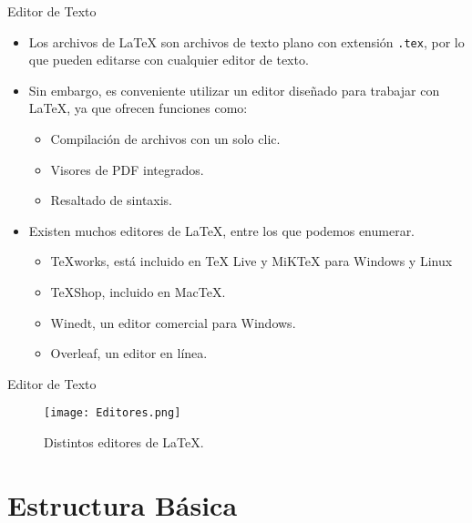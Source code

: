 \documentclass[12pt]{beamer}
\begin{document}
\begin{frame}{Editor de Texto}
  \begin{itemize}
    \item Los archivos de \LaTeX{} son archivos de texto plano con extensión {\color{blue}\texttt{.tex}}, por lo que pueden editarse con cualquier editor de texto.
    \item<2-> Sin embargo, es conveniente utilizar un editor diseñado para trabajar con LaTeX, ya que ofrecen funciones como:
    \begin{itemize}
      \item<3-> Compilación de archivos con un solo clic.
      \item<4-> Visores de PDF integrados.
      \item<5-> Resaltado de sintaxis.
    \end{itemize}
    \item<6-> Existen muchos editores de \LaTeX{}, entre los que podemos enumerar.
    \begin{itemize}
      \item<7-> TeXworks, está incluido en TeX Live y MiKTeX para Windows y Linux
      \item<8-> TeXShop, incluido en MacTeX.
      \item<9-> Winedt, un editor comercial para Windows.
      \item<10-> Overleaf, un editor en línea.
    \end{itemize}    
  \end{itemize}
\end{frame}
\begin{frame}{Editor de Texto}  
    \begin{figure}
      \centering
      \texttt{[image: Editores.png]}
      \caption{Distintos editores de \LaTeX.}
      \label{fig:ejemplo_imagen}
    \end{figure}
\end{frame}
\section{Estructura Básica}
\end{document}
